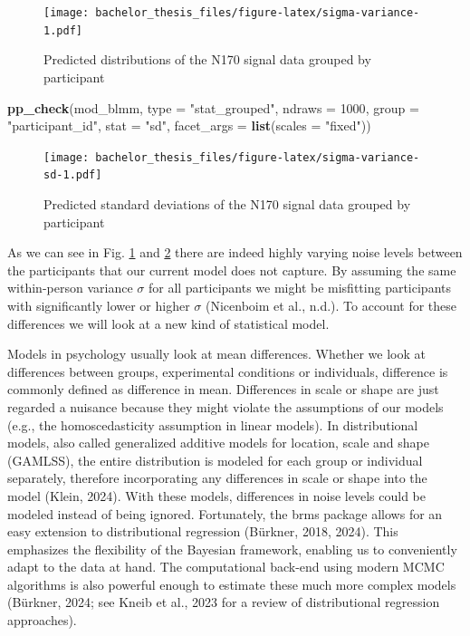 \documentclass[
  doc,12pt,floatsintext]{apa7}
\newenvironment{Shaded}{\begin{snugshade}}{\end{snugshade}}
\newcommand{\AttributeTok}[1]{\textcolor[rgb]{0.13,0.29,0.53}{#1}}
\newcommand{\DecValTok}[1]{\textcolor[rgb]{0.00,0.00,0.81}{#1}}
\newcommand{\FunctionTok}[1]{\textcolor[rgb]{0.13,0.29,0.53}{\textbf{#1}}}
\newcommand{\NormalTok}[1]{#1}
\newcommand{\StringTok}[1]{\textcolor[rgb]{0.31,0.60,0.02}{#1}}
\begin{document}
\begin{figure}
\centering
\texttt{[image: bachelor\_thesis\_files/figure-latex/sigma-variance-1.pdf]}
\caption{\label{fig:sigma-variance}Predicted distributions of the N170 signal data grouped by participant}
\end{figure}



\begin{Shaded}
\begin{Highlighting}[]
\FunctionTok{pp\_check}\NormalTok{(mod\_blmm,}
         \AttributeTok{type =} \StringTok{"stat\_grouped"}\NormalTok{,}
         \AttributeTok{ndraws =} \DecValTok{1000}\NormalTok{,}
         \AttributeTok{group =} \StringTok{"participant\_id"}\NormalTok{,}
         \AttributeTok{stat =} \StringTok{"sd"}\NormalTok{,}
         \AttributeTok{facet\_args =} \FunctionTok{list}\NormalTok{(}\AttributeTok{scales =} \StringTok{"fixed"}\NormalTok{))}
\end{Highlighting}
\end{Shaded}

\begin{figure}
\centering
\texttt{[image: bachelor\_thesis\_files/figure-latex/sigma-variance-sd-1.pdf]}
\caption{\label{fig:sigma-variance-sd}Predicted standard deviations of the N170 signal data grouped by participant}
\end{figure}

As we can see in Fig. \ref{fig:sigma-variance} and \ref{fig:sigma-variance-sd} there are indeed highly varying noise levels between the participants that our current model does not capture. By assuming the same within-person variance \(\sigma\) for all participants we might be misfitting participants with significantly lower or higher \(\sigma\) (Nicenboim et al., n.d.). To account for these differences we will look at a new kind of statistical model.

Models in psychology usually look at mean differences. Whether we look at differences between groups, experimental conditions or individuals, difference is commonly defined as difference in mean. Differences in scale or shape are just regarded a nuisance because they might violate the assumptions of our models (e.g., the homoscedasticity assumption in linear models). In distributional models, also called generalized additive models for location, scale and shape (GAMLSS), the entire distribution is modeled for each group or individual separately, therefore incorporating any differences in scale or shape into the model (Klein, 2024). With these models, differences in noise levels could be modeled instead of being ignored. Fortunately, the brms package allows for an easy extension to distributional regression (Bürkner, 2018, 2024). This emphasizes the flexibility of the Bayesian framework, enabling us to conveniently adapt to the data at hand. The computational back-end using modern MCMC algorithms is also powerful enough to estimate these much more complex models (Bürkner, 2024; see Kneib et al., 2023 for a review of distributional regression approaches).
\end{document}
